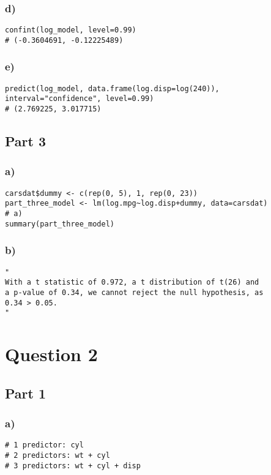 \documentclass{article}
\begin{document}
\subsubsection*{d)}
\begin{verbatim}
confint(log_model, level=0.99)
# (-0.3604691, -0.12225489)
\end{verbatim}

\subsubsection*{e)}
\begin{verbatim}
predict(log_model, data.frame(log.disp=log(240)), interval="confidence", level=0.99)
# (2.769225, 3.017715)
\end{verbatim}

\subsection*{Part 3}
\subsubsection*{a)}
\begin{verbatim}
carsdat$dummy <- c(rep(0, 5), 1, rep(0, 23))
part_three_model <- lm(log.mpg~log.disp+dummy, data=carsdat)
# a)
summary(part_three_model)
\end{verbatim}

\subsubsection*{b)}
\begin{verbatim}
"
With a t statistic of 0.972, a t distribution of t(26) and 
a p-value of 0.34, we cannot reject the null hypothesis, as
0.34 > 0.05. 
"
\end{verbatim}

\section*{Question 2}
\subsection*{Part 1}
\subsubsection*{a)}
\begin{verbatim}
# 1 predictor: cyl
# 2 predictors: wt + cyl
# 3 predictors: wt + cyl + disp
\end{verbatim}
\end{document}
